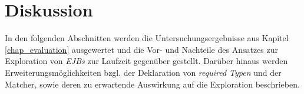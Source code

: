 \chapter{Diskussion}
In den folgenden Abschnitten werden die Untersuchungsergebnisse aus Kapitel \ref{chap_evaluation} ausgewertet und die Vor- und Nachteile des Ansatzes zur Exploration von \emph{EJBs} zur Laufzeit gegenüber gestellt. Darüber hinaus werden Erweiterungsmöglichkeiten bzgl. der Deklaration von \emph{required Typen} und der Matcher, sowie deren zu erwartende Auswirkung auf die Exploration beschrieben.

